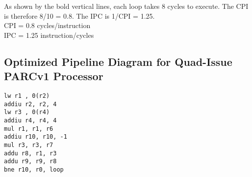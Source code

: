\documentclass[10pt]{article}
\begin{document}
As shown by the bold vertical lines, each loop takes 8 cycles to execute. The CPI is therefore 8/10 = 0.8. The IPC is 1/CPI = 1.25.\\
CPI = 0.8 cycles/instruction\\
IPC = 1.25 instruction/cycles\\

\subsection{Optimized Pipeline Diagram for Quad-Issue PARCv1 Processor}

\begin{lstlisting}
lw r1 , 0(r2)     
addiu r2, r2, 4   
lw r3 , 0(r4)     
addiu r4, r4, 4   
mul r1, r1, r6    
addiu r10, r10, -1
mul r3, r3, r7    
addu r8, r1, r3   
addu r9, r9, r8   
bne r10, r0, loop                
\end{lstlisting}
\end{document}
